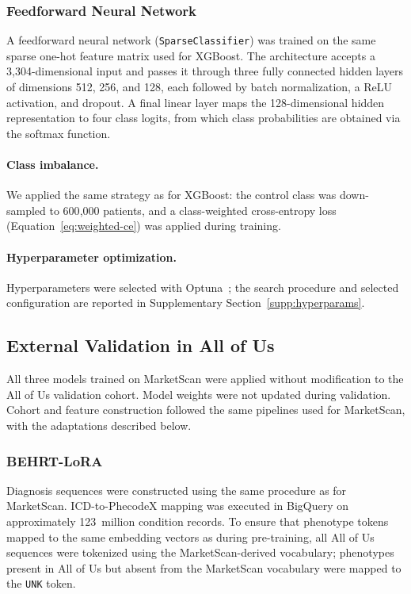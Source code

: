 \documentclass[12pt]{article}
\begin{document}
\subsubsection{Feedforward Neural Network}

A feedforward neural network (\texttt{SparseClassifier}) was trained on the same sparse one-hot feature matrix used for XGBoost. The architecture accepts a 3{,}304-dimensional input and passes it through three fully connected hidden layers of dimensions 512, 256, and 128, each followed by batch normalization, a ReLU activation, and dropout. A final linear layer maps the 128-dimensional hidden representation to four class logits, from which class probabilities are obtained via the softmax function.

\paragraph{Class imbalance.}
We applied the same strategy as for XGBoost: the control class was down-sampled to 600{,}000 patients, and a class-weighted cross-entropy loss (Equation~\eqref{eq:weighted-ce}) was applied during training.

\paragraph{Hyperparameter optimization.}
Hyperparameters were selected with Optuna~\citep{Akiba2019Optuna}; the search procedure and selected configuration are reported in Supplementary Section~\ref{supp:hyperparams}.

\subsection{External Validation in All of Us}

All three models trained on MarketScan were applied without modification to the All of Us validation cohort. Model weights were not updated during validation. Cohort and feature construction followed the same pipelines used for MarketScan, with the adaptations described below.

\subsubsection{BEHRT-LoRA}

Diagnosis sequences were constructed using the same procedure as for MarketScan. ICD-to-PhecodeX mapping was executed in BigQuery on approximately 123~million condition records. To ensure that phenotype tokens mapped to the same embedding vectors as during pre-training, all All of Us sequences were tokenized using the MarketScan-derived vocabulary; phenotypes present in All of Us but absent from the MarketScan vocabulary were mapped to the \texttt{UNK} token.
\end{document}
